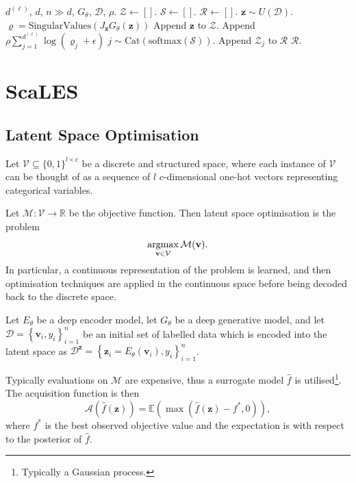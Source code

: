 \begin{algorithm}
\caption{Polarity sampling.}\label{alg:polarity}
\begin{algorithmic}
\Require $d^{(\ell)}$, $d$, $n\gg d$, $G_{\theta}$, $\mathcal{D}$, $\rho$.
\State $\mathcal{Z}\leftarrow[]$.
\State $\mathcal{S}\leftarrow[]$.
\State $\mathcal{R}\leftarrow[]$.
\State $\mathbf{z}\sim U(\mathcal{D})$.
\State $\varrho=\text{SingularValues}\left(J_{\mathbf{z}}G_{\theta}(\mathbf{z})\right)$
\State Append $\mathbf{z}$ to $\mathcal{Z}$.
\State Append $\rho\sum_{j=1}^{d^{(\ell)}}\log\left(\varrho_j+\epsilon\right)$
\EndFor
{}
\State $j\sim\text{Cat}(\mathrm{softmax}(\mathcal{S}))$.
\State Append $\mathcal{Z}_j$ to $\mathcal{R}$
\EndFor
\State \Return $\mathcal{R}$.
\end{algorithmic}
\end{algorithm}

\section{ScaLES}\label{sec:scales}

\subsection{Latent Space Optimisation}

Let $\mathcal{V}\subseteq\{0,1\}^{l\times c}$ be a discrete and structured space, where each instance of $\mathcal{V}$ can be thought of as a sequence of $l$ $c$-dimensional one-hot vectors representing categorical variables.

Let $\mathcal{M}:\mathcal{V}\to\mathbb{R}$ be the objective function. Then latent space optimisation is the problem $$\operatorname*{\mathrm{argmax}}_{\mathbf{v}\in\mathcal{V}}\mathcal{M}(\mathbf{v}).$$In particular, a continuous representation of the problem is learned, and then optimisation techniques are applied in the continuous space before being decoded back to the discrete space.

Let $E_{\theta}$ be a deep encoder model, let $G_{\theta}$ be a deep generative model, and let $\mathcal{D}=\left\{\mathbf{v}_i,y_i\right\}_{i=1}^n$ be an initial set of labelled data which is encoded into the latent space as $\mathcal{D}^{\mathbf{z}}=\left\{\mathbf{z}_i=E_{\theta}\left(\mathbf{v}_i\right),y_i\right\}_{i=1}^n$.

Typically evaluations on $\mathcal{M}$ are expensive, thus a surrogate model $\hat{f}$ is utilised\footnote{Typically a Gaussian process.}. The acquisition function is then $$\mathcal{A}\left(\hat{f}(\mathbf{z})\right)=\mathbb{E}\left(\max\left(\hat{f}(\mathbf{z})-f^*,0\right)\right),$$where $f^*$ is the best observed objective value and the expectation is with respect to the posterior of $\hat{f}$.

